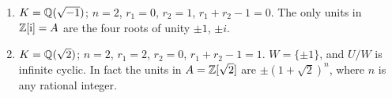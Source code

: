 \begin{examples}
\begin{enumerate}[1)]
    \item $K = \mathbb{Q}(\sqrt{-1})$; $n = 2$, $r_1 = 0$, $r_2 = 1$, $r_1 + r_2 - 1 = 0$. The only units in $\mathbb{Z}[\mathrm{i}] = A$ are the four roots of unity $\pm 1$, $\pm i$.
    
    \item $K = \mathbb{Q}(\sqrt{2})$; $n = 2$, $r_1 = 2$, $r_2 = 0$, $r_1 + r_2 - 1 = 1$. $W = \{\pm 1\}$, and $U/W$ is infinite cyclic. In fact the units in $A = \mathbb{Z}[\sqrt{2}]$ are $\pm(1 + \sqrt{2})^n$, where $n$ is any rational integer.
\end{enumerate}
\end{examples}


